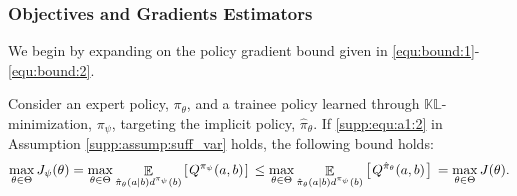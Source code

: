 \subsubsection{Objectives and Gradients Estimators}

We begin by expanding on the policy gradient bound given in \eqref{equ:bound:1}-\eqref{equ:bound:2}.
\begin{lemma}
Consider an expert policy, $\pi_{\theta}$, and a trainee policy learned through $\mathbb{KL}$-minimization, $\pi_{\psi}$, targeting the implicit policy, $\hat{\pi}_{\theta}$. If \eqref{supp:equ:a1:2} in Assumption \ref{supp:assump:suff_var} holds, the following bound holds:
\begin{align}
    \max_{\theta \in \Theta} J_{\psi}(\theta) = \max_{\theta \in \Theta} \mathop{\mathbb{E}}_{{\hat{\pi}_\theta(a|b) d^{{\pi_{\psi}}}(b)}} \left[ \hspace*{0.1em}{}  Q^{{\pi_{\psi}}}(a,b) \hspace*{0.1em} \right]{}  
    \leq \max_{\theta \in \Theta}  \mathop{\mathbb{E}}_{\hat{\pi}_\theta(a|b) d^{{\pi_{\psi}}}(b)} \left[ \hspace*{0.1em}{}  Q^{{\hat{\pi}_{\theta}}}(a,b) \hspace*{0.1em} \right]{}  = \max_{\theta \in \Theta} J(\theta) . \label{supp:equ:bound}
\end{align}
\end{lemma}
